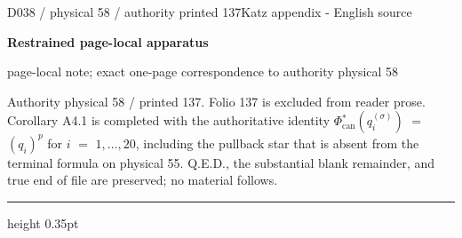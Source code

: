 \documentclass[9pt]{article}
\newcommand{\CanonText}[1]{\par{\fontsize{8.0}{9.35}\selectfont\RaggedRight #1\par}\vspace{2.2pt}}
\newcommand{\LayerTitle}{Restrained page-local apparatus}
\begin{document}
\noindent\begin{minipage}[t][\dimexpr\textheight-5pt\relax][t]{\textwidth}
{\sffamily\fontsize{7.3}{8.2}\selectfont\color{Quiet} D038 / physical 58 / authority printed 137\hfill Katz appendix - English source}
\par{}\vspace{4.5pt}
{\sffamily\fontsize{10.4}{11.6}\selectfont\bfseries\color{Accent} \LayerTitle}
\par{\sffamily\fontsize{6.7}{7.7}\selectfont\color{Quiet} page-local note; exact one-page correspondence to authority physical 58}
\vspace{5pt}
\CanonText{Authority physical 58 / printed 137. Folio 137 is excluded from reader prose. Corollary A4.1 is completed with the authoritative identity \(\Phi{}_{\mathrm{can}}^{*}(q_{i}^{(\sigma{})})\) \(=\) \((q_{i})^{p}\) for \(i\) \(=\) \(1,\ldots{},20\), including the pullback star that is absent from the terminal formula on physical 55. Q.E.D., the substantial blank remainder, and true end of file are preserved; no material follows.}
\vfill
{\color{Accent}\hrule height 0.35pt}\vspace{3pt}
\end{minipage}
\end{document}
